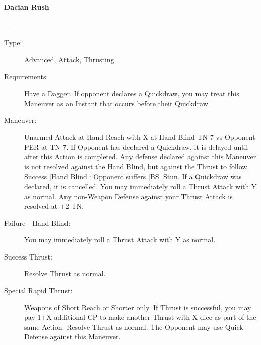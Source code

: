 \documentclass[oneside,11pt,english]{book}
\begin{document}
\paragraph{\large\label{man:Dacian Rush}Dacian Rush}---\quad{\large[2+X+Y]}
\vspace{-10pt}\begin{description}
\item [Type:] Advanced, Attack, Thrusting 
\item [Requirements:] Have a Dagger. If opponent declares a Quickdraw, you may treat this Maneuver as an Instant that occurs before their Quickdraw.
\item [Maneuver:] Unarmed Attack at Hand Reach with X at Hand Blind TN 7 vs Opponent PER at TN 7. If Opponent has declared a Quickdraw, it is delayed until after this Action is completed. Any defense declared against this Maneuver is not resolved against the Hand Blind, but against the Thrust to follow. Success [Hand Blind]: Opponent suffers [BS] Stun. If a Quickdraw was declared, it is cancelled. You may immediately roll a Thrust Attack with Y as normal. Any non-Weapon Defense against your Thrust Attack is resolved at +2 TN.
\item [Failure - Hand Blind:] You may immediately roll a Thrust Attack with Y as normal. 
\item [Success Thrust:] Resolve Thrust as normal. 
\item [Special Rapid Thrust:] Weapons of Short Reach or Shorter only. If Thrust is successful, you may pay 1+X additional CP to make another Thrust with X dice as part of the same Action. Resolve Thrust as normal. The Opponent may use Quick Defense against this Maneuver. 
\end{description}
\end{document}
